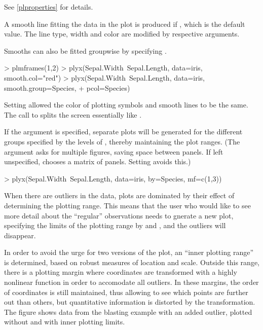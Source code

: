 \documentclass[11pt]{article}
\begin{document}
See \ref{plproperties} for details.

A smooth line fitting the data in the plot is produced if 
, which is the default value. 
The line type, width and color are modified by respective arguments.

Smooths can also be fitted groupwise by specifying .

\begin{Schunk}
\begin{Sinput}
> plmframes(1,2)
> plyx(Sepal.Width~Sepal.Length, data=iris, smooth.col="red")
> plyx(Sepal.Width~Sepal.Length, data=iris, smooth.group=Species,
+      pcol=Species)
\end{Sinput}
\end{Schunk}
Setting  allowed the color of plotting symbols and smooth
lines to be the same.
The call to  splits the screen essentially like 
.

If the argument  is specified, separate plots will be generated
for the different groups specified by the levels of , 
thereby maintaining the plot ranges.
(The argument  asks for multiple figures, saving space between panels. 
If left unspecified,  chooses a matrix of panels. 
Setting  avoids this.)

\begin{Schunk}
\begin{Sinput}
> plyx(Sepal.Width~Sepal.Length, data=iris, by=Species, mf=c(1,3))
\end{Sinput}
\end{Schunk}

When there are outliers in the data, plots are dominated by their effect of
determining the plotting range. This means that the user who would like to
see more detail about the ``regular'' observations needs to gnerate a new
plot, specifying the limits of the plotting range by  and ,
and the outliers will disappear.

In order to avoid the urge for two versions of the plot, an ``inner
plotting range'' is determined, based on robust measures of 
location and scale. Outside this range, there is a plotting margin where
coordinates are transformed with a highly nonlinear function in order to
accomodate all outliers. 
In these margins, the order of coordinates is still maintained, thus
allowing to see which points are further out than others, but quantitative
information is distorted by the transformation.
The figure shows data from the blasting example with an added outlier,
plotted without and with inner plotting limits.
\end{document}
